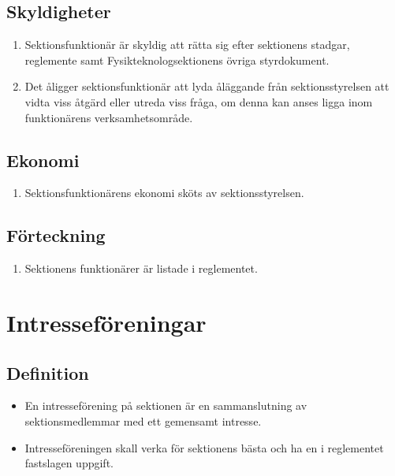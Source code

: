 \documentclass[11pt,a4paper]{article}
\begin{document}
\subsection{Skyldigheter}

\begin{enumerate}[\thesubsection .1]

  \item Sektionsfunktionär är skyldig att rätta sig efter sektionens
  stadgar, reglemente samt Fysikteknologsektionens övriga styrdokument. 

  \item Det åligger sektionsfunktionär att lyda åläggande från
  sektions\-styrel\-sen att vidta viss åtgärd eller utreda viss fråga, om denna kan anses ligga inom funktionärens verksamhetsområde.

\end{enumerate}

\subsection{Ekonomi}

\begin{enumerate}[\thesubsection .1]

  \item Sektionsfunktionärens ekonomi sköts av sektionsstyrelsen.

\end{enumerate}

\subsection{Förteckning}

\begin{enumerate}[\thesubsection .1]


\item Sektionens funktionärer är listade i reglementet.
\end{enumerate}

\newpage


\section{Intresseföreningar}


\subsection{Definition}

\begin{itemize}

  \item En intresseförening på sektionen är en samman\-slutning av sektions\-medlemmar med ett gemensamt intresse.

  \item Intresseföreningen skall verka för sektionens bästa och ha en
  i reglementet fastslagen uppgift.

\end{itemize}
\end{document}
